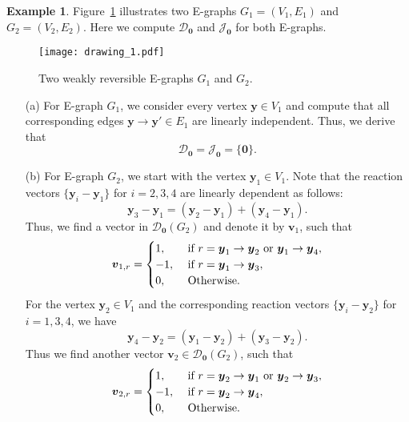 \documentclass[11pt]{article}
\theoremstyle{plain}
\theoremstyle{definition}
\newtheorem{example}[theorem]{Example}
\theoremstyle{remark}
\newcommand\by{\boldsymbol{y}}
\newcommand\bv{\boldsymbol{v}}
\newcommand{\eJ}{\mathcal{J}_{\textbf{0}}}
\newcommand{\mD}{\mathcal{D}_{\textbf{0}}}
\begin{document}
\begin{example}
\label{ex:D0J0G2G3}
Figure~\ref{fig:graphs_D_J} illustrates two E-graphs $G_1 = (V_1, E_1)$ and $G_2 = (V_2, E_2)$. Here we compute $\mD$ and $\eJ$ for both E-graphs. 

\begin{figure}[H]
\centering
\texttt{[image: drawing\_1.pdf]}
\caption{Two weakly reversible E-graphs $G_1$ and $G_2$.}
\label{fig:graphs_D_J}
\end{figure} 

\begin{enumerate}
\item[(a)] For E-graph $G_1$, we consider every vertex $\by \in V_1$ and compute that all corresponding edges $\by \to \by' \in E_1$ are linearly independent. Thus, we derive that
\[
\mD = \eJ = \{ \mathbf{0} \}.
\]

\item[(b)] For E-graph $G_2$, we start with the vertex $\by_1 \in V_1$. Note that the reaction vectors $\{ \by_i - \by_1 \}$ for $i = 2,3,4$ are linearly dependent as follows:
\[
\by_3 - \by_1 = (\by_2 - \by_1) + (\by_4 - \by_1).
\]
Thus, we find a vector in $\mD(G_2)$ and denote it by $\bv_1$, such that
\begin{equation} \notag
\bv_{1, r} = 
\begin{cases}
1, & \text{ if } r = \by_1 \to \by_2 \text{ or } \by_1 \to \by_4, \\
-1, & \text{ if } r = \by_1 \to \by_3, \\
0, & \text{ Otherwise}.
\end{cases}
\end{equation}
For the vertex $\by_2 \in V_1$ and the corresponding reaction vectors $\{ \by_i - \by_2 \}$ for $i = 1,3,4$, we have
\[
\by_4 - \by_2 = (\by_1 - \by_2) + (\by_3 - \by_2).
\]
Thus we find another vector $\bv_2 \in \mD(G_2)$, such that
\begin{equation} \notag
\bv_{2, r} = 
\begin{cases}
1, & \text{ if } r = \by_2 \to \by_1 \text{ or } \by_2 \to \by_3, \\
-1, & \text{ if } r = \by_2 \to \by_4, \\
0, & \text{ Otherwise}.
\end{cases}
\end{equation}


\end{enumerate}
\end{example}
\end{document}
